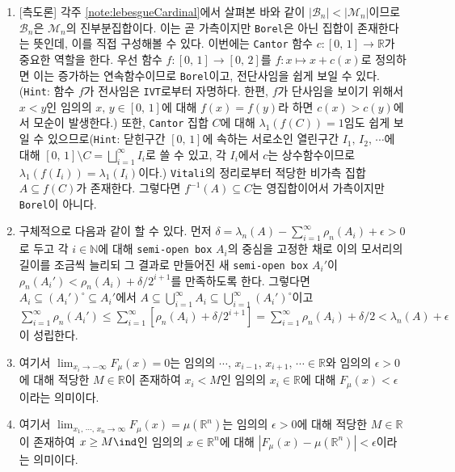 \begin{enumerate}[label = \textsf{\textbf{\arabic*}}]
    \item \textsf{[측도론]} 각주 \ref{note:lebesgueCardinal}에서 살펴본 바와 같이 $|\mathcal{B}_n|<|\mathcal{M}_n|$이므로 $\mathcal{B}_n$은 $\mathcal{M}_n$의 진부분집합이다. 이는 곧 가측이지만 \texttt{Borel}은 아닌 집합이 존재한다는 뜻인데, 이를 직접 구성해볼 수 있다. 이번에는 \texttt{Cantor} 함수 $c:[0,\,1]\to\mathbb{R}$가 중요한 역할을 한다. 우선 함수 $f:[0,\,1]\to[0,\,2]$를 $f:x\mapsto x+c(x)$로 정의하면 이는 증가하는 연속함수이므로 \texttt{Borel}이고, 전단사임을 쉽게 보일 수 있다. (\texttt{Hint}: 함수 $f$가 전사임은 \texttt{IVT}로부터 자명하다. 한편, $f$가 단사임을 보이기 위해서 $x<y$인 임의의 $x,\,y\in[0,\,1]$에 대해 $f(x)=f(y)$라 하면 $c(x)>c(y)$에서 모순이 발생한다.) 또한, \texttt{Cantor} 집합 $C$에 대해 $\lambda_1(f(C))=1$임도 쉽게 보일 수 있으므로(\texttt{Hint}: 닫힌구간 $[0,\,1]$에 속하는 서로소인 열린구간 $I_1,\,I_2,\,\cdots$에 대해 $[0,\,1]\setminus C=\bigsqcup_{i=1}^\infty I_i$로 쓸 수 있고, 각 $I_i$에서 $c$는 상수함수이므로 $\lambda_1(f(I_i))=\lambda_1(I_i)$이다.) \texttt{Vitali}의 정리로부터 적당한 비가측 집합 $A\subseteq f(C)$가 존재한다. 그렇다면 $f^{-1}(A)\subseteq C$는 영집합이어서 가측이지만 \texttt{Borel}이 아니다.
    \item 구체적으로 다음과 같이 할 수 있다. 먼저 $\delta=\lambda_n(A)-\sum_{i=1}^\infty\rho_n(A_i)+\epsilon>0$로 두고 각 $i\in\mathbb{N}$에 대해 \texttt{semi-open box} $A_i$의 중심을 고정한 채로 이의 모서리의 길이를 조금씩 늘리되 그 결과로 만들어진 새 \texttt{semi-open box} $A_i'$이 $\rho_n(A_i')<\rho_n(A_i)+\delta/2^{i+1}$를 만족하도록 한다. 그렇다면 $A_i\subseteq(A_i')^\circ\subseteq A_i'$에서 $A\subseteq\bigcup_{i=1}^\infty A_i\subseteq\bigcup_{i=1}^\infty(A_i')^\circ$이고 $\sum_{i=1}^\infty\rho_n(A_i')\leq\sum_{i=1}^\infty[\rho_n(A_i)+\delta/2^{i+1}]=\sum_{i=1}^\infty\rho_n(A_i)+\delta/2<\lambda_n(A)+\epsilon$이 성립한다.
    \item 여기서 $\lim_{x_i\to-\infty}F_\mu(x)=0$는 임의의 $\cdots,\,x_{i-1},\,x_{i+1},\,\cdots\in\mathbb{R}$와 임의의 $\epsilon>0$에 대해 적당한 $M\in\mathbb{R}$이 존재하여 $x_i<M$인 임의의 $x_i\in\mathbb{R}$에 대해 $F_\mu(x)<\epsilon$이라는 의미이다.
    \item 여기서 $\lim_{x_1,\,\cdots,\,x_n\to\infty}F_\mu(x)=\mu(\mathbb{R}^n)$는 임의의 $\epsilon>0$에 대해 적당한 $M\in\mathbb{R}$이 존재하여 $x\geq M\ind$인 임의의 $x\in\mathbb{R}^n$에 대해 $|F_\mu(x)-\mu(\mathbb{R}^n)|<\epsilon$이라는 의미이다.

\end{enumerate}
